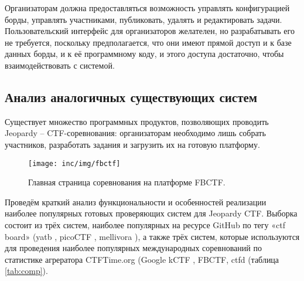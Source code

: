 Организаторам должна предоставляться возможность управлять конфигурацией борды, управлять участниками, публиковать, удалять и редактировать задачи. Пользовательский интерфейс для организаторов желателен, но разрабатывать его не требуется, поскольку предполагается, что они имеют прямой доступ и к базе данных борды, и к её программному коду, и этого доступа достаточно, чтобы взаимодействовать с системой.


\subsection{Анализ аналогичных существующих систем}

Существует множество программных продуктов, позволяющих проводить Jeopardy -- CTF-соревнования: организаторам необходимо лишь собрать участников, разработать задания и загрузить их на готовую платформу.

\begin{figure}[h!]
  \centering
  \texttt{[image: inc/img/fbctf]}\\
  \caption{Главная страница соревнования на платформе FBCTF.}
  \label{fig:fbctf}
\end{figure}

Проведём краткий анализ функциональности и особенностей реализации наиболее популярных готовых проверяющих систем для Jeopardy CTF. Выборка состоит из трёх систем, наиболее популярных на ресурсе GitHub \cite{GithubCTFTag} по тегу «ctf board» (yatb \cite{yatb}, picoCTF \cite{picoctf}, mellivora \cite{mellivora}), а также трёх систем, которые используются для проведения наиболее популярных международных соревнований по статистике агрератора CTFTime.org \cite{CTFTime} (Google kCTF \cite{kctf}, FBCTF, ctfd \cite{ctfd} (таблица \ref{tab:comp}).

